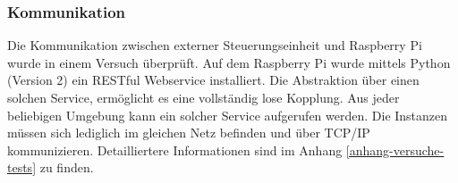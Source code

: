 \subsubsection{Kommunikation}
Die Kommunikation zwischen externer Steuerungseinheit und Raspberry Pi wurde in einem Versuch überprüft. Auf dem Raspberry Pi wurde mittels Python (Version 2) ein RESTful Webservice installiert. Die Abstraktion über einen solchen Service, ermöglicht es eine vollständig lose Kopplung. Aus jeder beliebigen Umgebung kann ein solcher Service aufgerufen werden. Die Instanzen müssen sich lediglich im gleichen Netz befinden und über TCP/IP kommunizieren. Detailliertere Informationen sind im Anhang \ref{anhang-versuche-tests} zu finden.